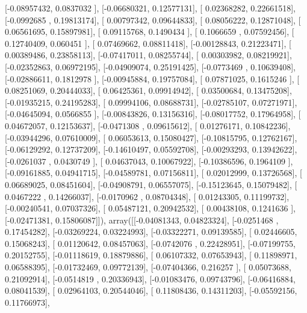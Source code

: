 \documentclass{article}
\begin{document}
       [-0.08957432,  0.0837032 ],
       [-0.06680321,  0.12577131],
       [ 0.02368282,  0.22661518],
       [-0.0992685 ,  0.19813174],
       [ 0.00797342,  0.09644833],
       [ 0.08056222,  0.12871048],
       [ 0.06561695,  0.15897981],
       [ 0.09115768,  0.1490434 ],
       [ 0.1066659 ,  0.07592456],
       [ 0.12740409,  0.060451  ],
       [ 0.07469662,  0.08811418],
       [-0.00128843,  0.21223471],
       [ 0.00389486,  0.23858113],
       [-0.07417011,  0.08255744],
       [ 0.00303982,  0.08219921],
       [-0.02352863,  0.06972195],
       [-0.04909074,  0.25191425],
       [-0.0773469 ,  0.10639408],
       [-0.02886611,  0.1812978 ],
       [-0.00945884,  0.19757084],
       [ 0.07871025,  0.1615246 ],
       [ 0.08251069,  0.20444033],
       [ 0.06425361,  0.09914942],
       [ 0.03500684,  0.13475208],
       [-0.01935215,  0.24195283],
       [ 0.09994106,  0.08688731],
       [-0.02785107,  0.07271971],
       [-0.04645094,  0.0566855 ],
       [-0.00843826,  0.13156316],
       [-0.08017752,  0.17964958],
       [ 0.04672057,  0.12153637],
       [-0.0471308 ,  0.09615612],
       [ 0.01276171,  0.10842236],
       [-0.03944296,  0.07610009],
       [ 0.06053613,  0.15080427],
       [-0.10815795,  0.12762167],
       [-0.06129292,  0.12737209],
       [-0.14610497,  0.05592708],
       [-0.00293293,  0.13942622],
       [-0.0261037 ,  0.0430749 ],
       [ 0.04637043,  0.10067922],
       [-0.10386596,  0.1964109 ],
       [-0.09161885,  0.04941715],
       [-0.04589781,  0.07156811],
       [ 0.02012999,  0.13726568],
       [ 0.06689025,  0.08451604],
       [-0.04908791,  0.06557075],
       [-0.15123645,  0.15079482],
       [ 0.0467222 ,  0.14266037],
       [-0.0170962 ,  0.08704348],
       [ 0.01243305,  0.11199732],
       [-0.00240541,  0.07037326],
       [ 0.05487121,  0.20942532],
       [ 0.00438108,  0.1241636 ],
       [-0.02471381,  0.15806087]]), array([[-0.04081343,  0.04823324],
       [-0.0251468 ,  0.17454282],
       [-0.03269224,  0.03224993],
       [-0.03322271,  0.09139585],
       [ 0.02446605,  0.15068243],
       [ 0.01120642,  0.08457063],
       [-0.0742076 ,  0.22428951],
       [-0.07199755,  0.20152755],
       [-0.01118619,  0.18879886],
       [ 0.06107332,  0.07653943],
       [ 0.11898971,  0.06588395],
       [-0.01732469,  0.09772139],
       [-0.07404366,  0.216257  ],
       [ 0.05073688,  0.21092914],
       [-0.0514819 ,  0.20336943],
       [-0.01083476,  0.09743796],
       [-0.06416884,  0.08041539],
       [ 0.02964103,  0.20544046],
       [ 0.11808436,  0.14311203],
       [-0.05592156,  0.11766973],
\end{document}
